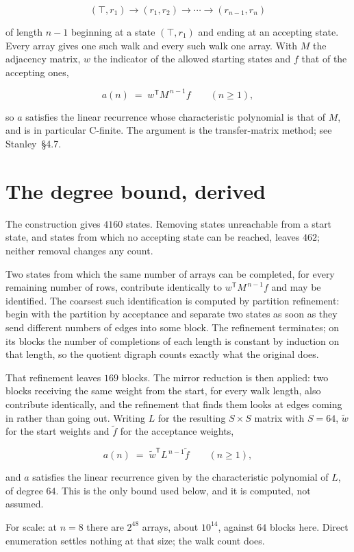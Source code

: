 \documentclass[11pt]{article}
\theoremstyle{definition}
\begin{document}
\[(\top,r_1) \to (r_1,r_2) \to \cdots \to (r_{n-1},r_n)\]

of length $n-1$ beginning at a state $(\top,r_1)$ and ending at an accepting state. Every array gives one such walk and every such walk one array. With $M$ the adjacency matrix, $w$ the indicator of the allowed starting states and $f$ that of the accepting ones,

\[a(n) \;=\; w^{\mathsf T} M^{\,n-1} f \qquad (n \ge 1),\]

so $a$ satisfies the linear recurrence whose characteristic polynomial is that of $M$, and is in particular C-finite. The argument is the transfer-matrix method; see Stanley~\S4.7.

\section{The degree bound, derived}

The construction gives $4160$ states. Removing states unreachable from a start state, and states from which no accepting state can be reached, leaves $462$; neither removal changes any count.

Two states from which the same number of arrays can be completed, for every remaining number of rows, contribute identically to $w^{\mathsf T}M^{\,n-1}f$ and may be identified. The coarsest such identification is computed by partition refinement: begin with the partition by acceptance and separate two states as soon as they send different numbers of edges into some block. The refinement terminates; on its blocks the number of completions of each length is constant by induction on that length, so the quotient digraph counts exactly what the original does.

That refinement leaves $169$ blocks. The mirror reduction is then applied: two blocks receiving the same weight from the start, for every walk length, also contribute identically, and the refinement that finds them looks at edges coming in rather than going out. Writing $L$ for the resulting $S \times S$ matrix with $S = 64$, $\tilde w$ for the start weights and $\tilde f$ for the acceptance weights,

\[a(n) \;=\; \tilde w^{\mathsf T} L^{\,n-1} \tilde f \qquad (n \ge 1),\]

and $a$ satisfies the linear recurrence given by the characteristic polynomial of $L$, of degree $64$. This is the only bound used below, and it is computed, not assumed.

For scale: at $n = 8$ there are $2^{48}$ arrays, about $10^{14}$, against $64$ blocks here. Direct enumeration settles nothing at that size; the walk count does.
\end{document}
